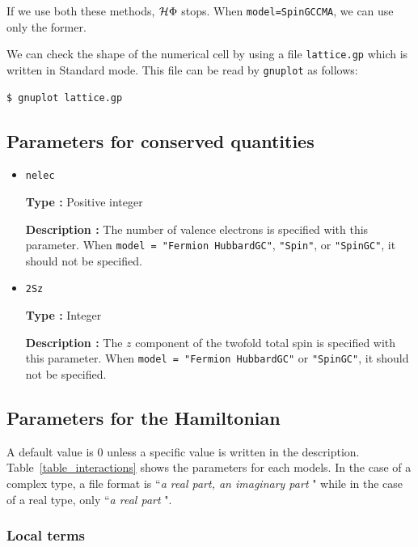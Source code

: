 If we use both these methods, $\mathcal{H} \Phi$ stops.
When \verb|model=SpinGCCMA|, we can use only the former.

We can check the shape of the numerical cell
by using a file \verb|lattice.gp|
which is written in Standard mode.
This file can be read by \verb|gnuplot| as follows:
\begin{verbatim}
$ gnuplot lattice.gp
\end{verbatim}

\subsection{Parameters for conserved quantities}

\begin{itemize}
\item \verb|nelec|

{\bf Type :} Positive integer

{\bf Description :} The number of valence electrons is specified with this parameter.
When \verb|model = "Fermion HubbardGC"|, \verb|"Spin"|, or  \verb|"SpinGC"|, 
it should not be specified.

\item \verb|2Sz|

{\bf Type :} Integer

{\bf Description :} The $z$ component of the twofold total spin is 
specified with this parameter.
When \verb|model = "Fermion HubbardGC"| or \verb|"SpinGC"|,
it should not be specified. 
\end{itemize}


\subsection{Parameters for the Hamiltonian}
A default value is $0$ unless a specific value is written in the description. 
Table~\ref{table_interactions} shows the parameters for each models. 
In the case of a complex type, a file format is ``{\it a real part, an imaginary part} "
 while in the case of a real type, only ``{\it a real part} ".


\subsubsection{Local terms}

